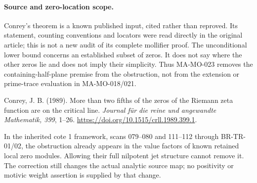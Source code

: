 \paragraph{Source and zero-location scope.}
Conrey's theorem is a known published input, cited rather
than reproved. Its statement, counting conventions and
locators were read directly in the original article; this
is not a new audit of its complete mollifier proof. The
unconditional lower bound concerns an established subset
of zeros. It does not say where the other zeros lie and
does not imply their simplicity. Thus MA-MO-023 removes
the containing-half-plane premise from the obstruction,
not from the extension or prime-trace evaluation in
MA-MO-018/021.

Conrey, J. B. (1989). More than two fifths of the zeros
of the Riemann zeta function are on the critical line.
\emph{Journal f\"ur die reine und angewandte Mathematik,
399}, 1--26. \url{https://doi.org/10.1515/crll.1989.399.1}.

In the inherited cote 1 framework, scans 079--080 and
111--112 through BR-TR-01/02, the obstruction already
appears in the value factors of known retained local
zero modules. Allowing their full nilpotent jet structure
cannot remove it. The correction still changes the
actual analytic source map; no positivity or motivic
weight assertion is supplied by that change.
